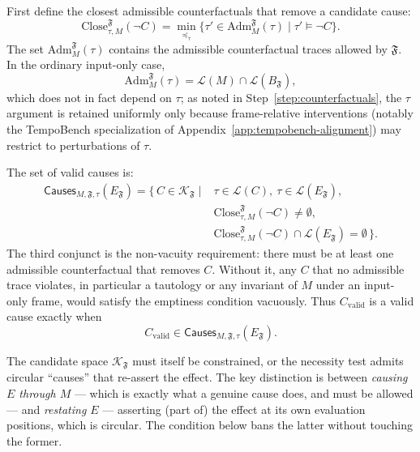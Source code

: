 \documentclass[11pt]{article}
\theoremstyle{remark}
\newcommand{\Close}{\mathrm{Close}}
\newcommand{\Lang}{\mathcal{L}}
\newcommand{\Frame}{\mathfrak{F}}
\newcommand{\Adm}{\mathrm{Adm}}
\begin{document}
First define the closest admissible counterfactuals that remove a candidate
cause:
\[
  \Close_{\tau,M}^{\Frame}(\neg C)
  =
  \min_{\preceq_\tau}
  \{
    \tau'\in \Adm_M^{\Frame}(\tau)
    \mid
    \tau'\models \neg C
  \}.
\]
The set \(\Adm_M^{\Frame}(\tau)\) contains the admissible counterfactual traces
allowed by \(\Frame\). In the ordinary input-only case,
\[
  \Adm_M^{\Frame}(\tau)
  =
  \Lang(M)\cap\Lang(B_{\Frame}),
\]
which does not in fact depend on \(\tau\); as noted in
Step~\ref{step:counterfactuals}, the \(\tau\) argument is retained uniformly only
because frame-relative interventions (notably the TempoBench specialization of
Appendix~\ref{app:tempobench-alignment}) may restrict to perturbations of
\(\tau\).

The set of valid causes is:
\[
\begin{aligned}
  \mathsf{Causes}_{M,\Frame,\tau}(E_{\Frame})
  =
  \{\,C\in\mathcal{K}_{\Frame}
  \mid{}&
  \tau\in\Lang(C),\ 
  \tau\in\Lang(E_{\Frame}),\\
  &
  \Close_{\tau,M}^{\Frame}(\neg C)\neq\emptyset,\\
  &
  \Close_{\tau,M}^{\Frame}(\neg C)
  \cap \Lang(E_{\Frame})=\emptyset
  \,\}.
\end{aligned}
\]
The third conjunct is the non-vacuity requirement: there must be at least one
admissible counterfactual that removes \(C\). Without it, any \(C\) that no
admissible trace violates, in particular a tautology or any invariant of \(M\)
under an input-only frame, would satisfy the emptiness condition vacuously.
Thus \(C_{\mathrm{valid}}\) is a valid cause exactly when
\[
  C_{\mathrm{valid}}
  \in
  \mathsf{Causes}_{M,\Frame,\tau}(E_{\Frame}).
\]

The candidate space \(\mathcal{K}_{\Frame}\) must itself be constrained, or the
necessity test admits circular ``causes'' that re-assert the effect. The key
distinction is between \emph{causing \(E\) through \(M\)} --- which is exactly
what a genuine cause does, and must be allowed --- and \emph{restating \(E\)} ---
asserting (part of) the effect at its own evaluation positions, which is
circular. The condition below bans the latter without touching the former.
\end{document}
